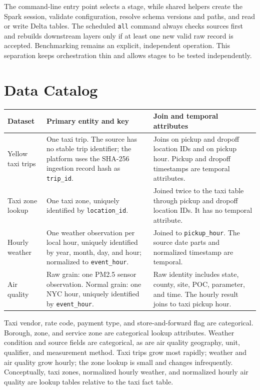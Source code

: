 \documentclass[10pt,a4paper]{article}
\begin{document}
The command-line entry point selects a stage, while shared helpers create the
Spark session, validate configuration, resolve schema versions and paths, and
read or write Delta tables. The scheduled \texttt{all} command always checks
sources first and rebuilds downstream layers only if at least one new valid raw
record is accepted. Benchmarking remains an explicit, independent operation.
This separation keeps orchestration thin and allows stages to be tested
independently.

\section{Data Catalog}

\begin{table}[H]
\centering
\small
\begin{tabularx}{\textwidth}{@{}L{2.5cm}L{4.0cm}Y@{}}
\toprule
\textbf{Dataset} & \textbf{Primary entity and key} & \textbf{Join and temporal attributes} \\
\midrule
Yellow taxi trips~\cite{nyctlc} & One taxi trip. The source has no stable trip identifier;
the platform uses the SHA-256 ingestion record hash as \texttt{trip\_id}. &
Joins on pickup and dropoff location IDs and on pickup hour. Pickup and dropoff
timestamps are temporal attributes. \\
Taxi zone lookup & One taxi zone, uniquely identified by
\texttt{location\_id}. & Joined twice to the taxi table through pickup and
dropoff location IDs. It has no temporal attribute. \\
Hourly weather & One weather observation per local hour, uniquely identified
by year, month, day, and hour; normalized to \texttt{event\_hour}. & Joined to
\texttt{pickup\_hour}. The source date parts and normalized timestamp are
temporal. \\
Air quality & Raw grain: one PM2.5 sensor observation. Normal grain: one NYC
hour, uniquely identified by \texttt{event\_hour}. & Raw identity includes
state, county, site, POC, parameter, and time. The hourly result joins to taxi
pickup hour. \\
\bottomrule
\end{tabularx}
\end{table}

Taxi vendor, rate code, payment type, and store-and-forward flag are
categorical. Borough, zone, and service zone are categorical lookup
attributes. Weather condition and source fields are categorical, as are air
quality geography, unit, qualifier, and measurement method. Taxi trips grow
most rapidly; weather and air quality grow hourly; the zone lookup is small and
changes infrequently. Conceptually, taxi zones, normalized hourly weather, and
normalized hourly air quality are lookup tables relative to the taxi fact
table.
\end{document}
